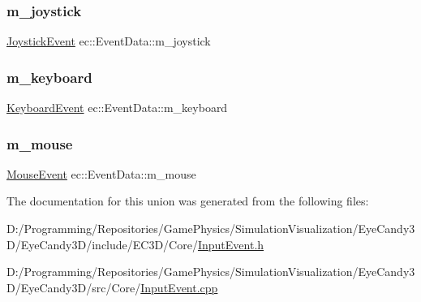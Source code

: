 \subsubsection{\texorpdfstring{m\+\_\+joystick}{m\_joystick}}
{\footnotesize\ttfamily \mbox{\hyperlink{structec_1_1_joystick_event}{Joystick\+Event}} ec\+::\+Event\+Data\+::m\+\_\+joystick}

\mbox{\label{unionec_1_1_event_data_a76d355d62f63e9947187e08bc520af45}} 
\subsubsection{\texorpdfstring{m\+\_\+keyboard}{m\_keyboard}}
{\footnotesize\ttfamily \mbox{\hyperlink{structec_1_1_keyboard_event}{Keyboard\+Event}} ec\+::\+Event\+Data\+::m\+\_\+keyboard}

\mbox{\label{unionec_1_1_event_data_a77d2274d869ab46f8f5f1e5d9616d4d3}} 
\subsubsection{\texorpdfstring{m\+\_\+mouse}{m\_mouse}}
{\footnotesize\ttfamily \mbox{\hyperlink{structec_1_1_mouse_event}{Mouse\+Event}} ec\+::\+Event\+Data\+::m\+\_\+mouse}



The documentation for this union was generated from the following files\+:\begin{DoxyCompactItemize}
\item 
D\+:/\+Programming/\+Repositories/\+Game\+Physics/\+Simulation\+Visualization/\+Eye\+Candy3\+D/\+Eye\+Candy3\+D/include/\+E\+C3\+D/\+Core/\mbox{\hyperlink{_input_event_8h}{Input\+Event.\+h}}\item 
D\+:/\+Programming/\+Repositories/\+Game\+Physics/\+Simulation\+Visualization/\+Eye\+Candy3\+D/\+Eye\+Candy3\+D/src/\+Core/\mbox{\hyperlink{_input_event_8cpp}{Input\+Event.\+cpp}}\end{DoxyCompactItemize}
